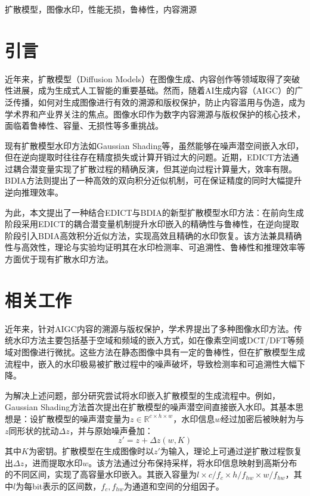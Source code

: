 \documentclass[conference]{IEEEtran}
\begin{document}
\begin{IEEEkeywords}
扩散模型，图像水印，性能无损，鲁棒性，内容溯源
\end{IEEEkeywords}

\section{引言}
近年来，扩散模型（Diffusion Models）在图像生成、内容创作等领域取得了突破性进展，成为生成式人工智能的重要基础。然而，随着AI生成内容（AIGC）的广泛传播，如何对生成图像进行有效的溯源和版权保护，防止内容滥用与伪造，成为学术界和产业界关注的焦点。图像水印作为数字内容溯源与版权保护的核心技术，面临着鲁棒性、容量、无损性等多重挑战。

现有扩散模型水印方法如Gaussian Shading\cite{Yang_2024_CVPR}等，虽然能够在噪声潜空间嵌入水印，但在逆向提取时往往存在精度损失或计算开销过大的问题。近期，EDICT\cite{panthi2025watermarkingdiffusionmodelgaussian}方法通过耦合潜变量实现了扩散过程的精确反演，但其逆向过程计算量大，效率有限。BDIA\cite{zhang2024exact}方法则提出了一种高效的双向积分近似机制，可在保证精度的同时大幅提升逆向推理效率。

为此，本文提出了一种结合EDICT与BDIA的新型扩散模型水印方法：在前向生成阶段采用EDICT的耦合潜变量机制提升水印嵌入的精确性与鲁棒性，在逆向提取阶段引入BDIA高效积分近似方法，实现高效且精确的水印恢复。该方法兼具精确性与高效性，理论与实验均证明其在水印检测率、可追溯性、鲁棒性和推理效率等方面优于现有扩散水印方法。

\section{相关工作}
近年来，针对AIGC内容的溯源与版权保护，学术界提出了多种图像水印方法。传统水印方法主要包括基于空域和频域的嵌入方式，如在像素空间或DCT/DFT等频域对图像进行微扰。这些方法在静态图像中具有一定的鲁棒性，但在扩散模型生成流程中，嵌入的水印极易被扩散过程中的噪声破坏，导致检测率和可追溯性大幅下降。

为解决上述问题，部分研究尝试将水印嵌入扩散模型的生成流程中。例如，Gaussian Shading方法\cite{Yang_2024_CVPR}首次提出在扩散模型的噪声潜空间直接嵌入水印。其基本思想是：设扩散模型的噪声潜变量为$z \in \mathbb{R}^{c \times h \times w}$，水印信息$w$经过加密后被映射为与$z$同形状的扰动$\Delta z$，并与原始噪声叠加：
\begin{equation}
    z' = z + \Delta z(w, K)
\end{equation}
其中$K$为密钥。扩散模型在生成图像时以$z'$为输入，理论上可通过逆扩散过程恢复出$\Delta z$，进而提取水印$w$。该方法通过分布保持采样，将水印信息映射到高斯分布的不同区间，实现了高容量水印嵌入。其嵌入容量为$l \times c / f_c \times h / f_{hw} \times w / f_{hw}$，其中$l$为每bit表示的区间数，$f_c, f_{hw}$为通道和空间的分组因子。
\end{document}
